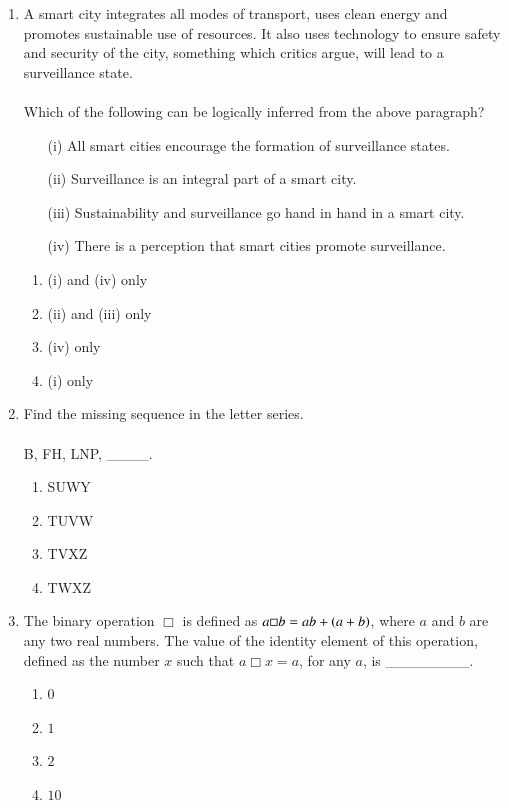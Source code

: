 \documentclass[journal]{IEEEtran}
\begin{document}
\begin{enumerate}
    \item A smart city integrates all modes of transport, uses clean energy and promotes sustainable use of resources. It also uses technology to ensure safety and security of the city, something which critics argue, will lead to a surveillance state. \\ \\ Which of the following can be logically inferred from the above paragraph?
        \begin{itemize}
            \item [(i)] All smart cities encourage the formation of surveillance states.
            \item [(ii)] Surveillance is an integral part of a smart city.
            \item [(iii)] Sustainability and surveillance go hand in hand in a smart city.
            \item [(iv)] There is a perception that smart cities promote surveillance.
        \end{itemize}

        \begin{enumerate}
            \item (i) and (iv) only
            \item (ii) and (iii) only
            \item (iv) only
            \item (i) only
        \end{enumerate}

    \item Find the missing sequence in the letter series. \\ \\ B, FH, LNP, \_\_\_\_.
        \begin{enumerate}
            \item SUWY
            \item TUVW
            \item TVXZ
            \item TWXZ
        \end{enumerate}

    \item The binary operation $\Box$ is defined as $a \Box b = ab+\left(a+b\right)$, where $a$ and $b$ are any two real numbers. The value of the identity element of this operation, defined as the number $x$ such that $a \Box x = a$, for any $a$, is \_\_\_\_\_\_\_\_.
        \begin{enumerate}
            \item $0$
            \item $1$
            \item $2$
            \item $10$
        \end{enumerate}


\end{enumerate}
\end{document}
